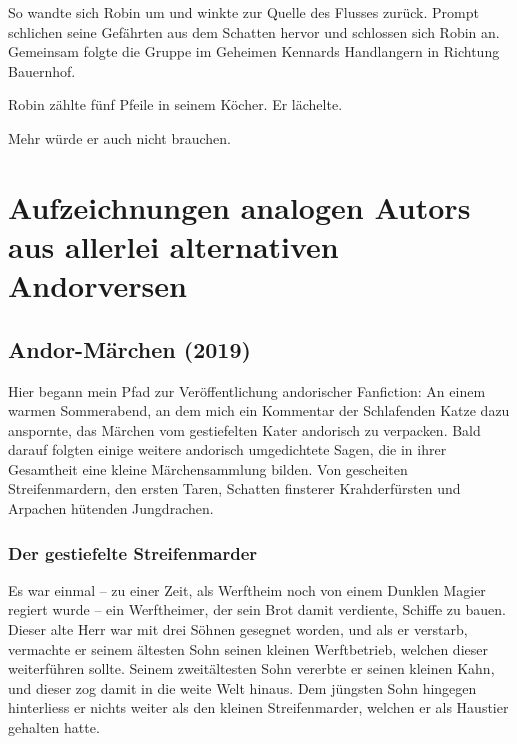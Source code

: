 \documentclass[10pt, a4paper, oneside]{book}
\begin{document}
So wandte sich Robin um und winkte zur Quelle des Flusses zurück. Prompt schlichen seine Gefährten aus dem Schatten hervor und schlossen sich Robin an. Gemeinsam folgte die Gruppe im Geheimen Kennards Handlangern in Richtung Bauernhof.

Robin zählte fünf Pfeile in seinem Köcher. Er lächelte.

Mehr würde er auch nicht brauchen.









\part{Aufzeichnungen analogen Autors aus allerlei alternativen Andorversen}


\begin{chapterbox}
    \chapter{Andor-Märchen (2019)}

    Hier begann mein Pfad zur Veröffentlichung andorischer Fanfiction: An einem warmen Sommerabend, an dem mich ein Kommentar der Schlafenden Katze dazu anspornte, das Märchen vom gestiefelten Kater andorisch zu verpacken. Bald darauf folgten einige weitere andorisch umgedichtete Sagen, die in ihrer Gesamtheit eine kleine Märchensammlung bilden. Von gescheiten Streifenmardern, den ersten Taren, Schatten finsterer Krahderfürsten und Arpachen hütenden Jungdrachen.
\end{chapterbox}

\extramarks{}{ }

\section{Der gestiefelte Streifenmarder}


Es war einmal – zu einer Zeit, als Werftheim noch von einem Dunklen Magier regiert wurde – ein Werftheimer, der sein Brot damit verdiente, Schiffe zu bauen. Dieser alte Herr war mit drei Söhnen gesegnet worden, und als er verstarb, vermachte er seinem ältesten Sohn seinen kleinen Werftbetrieb, welchen dieser weiterführen sollte. Seinem zweitältesten Sohn vererbte er seinen kleinen Kahn, und dieser zog damit in die weite Welt hinaus. Dem jüngsten Sohn hingegen hinterliess er nichts weiter als den kleinen Streifenmarder, welchen er als Haustier gehalten hatte.
\end{document}
